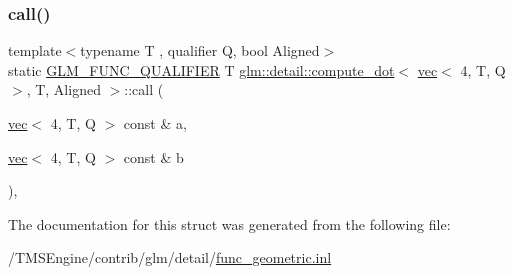 \subsubsection{\texorpdfstring{call()}{call()}}
{\footnotesize\ttfamily template$<$typename T , qualifier Q, bool Aligned$>$ \\
static \hyperlink{setup_8hpp_a33fdea6f91c5f834105f7415e2a64407}{G\+L\+M\+\_\+\+F\+U\+N\+C\+\_\+\+Q\+U\+A\+L\+I\+F\+I\+ER} T \hyperlink{structglm_1_1detail_1_1compute__dot}{glm\+::detail\+::compute\+\_\+dot}$<$ \hyperlink{structglm_1_1vec}{vec}$<$ 4, T, Q $>$, T, Aligned $>$\+::call (\begin{DoxyParamCaption}\item[{\hyperlink{structglm_1_1vec}{vec}$<$ 4, T, Q $>$ const \&}]{a,  }\item[{\hyperlink{structglm_1_1vec}{vec}$<$ 4, T, Q $>$ const \&}]{b }\end{DoxyParamCaption})\hspace{0.3cm}{\ttfamily [inline]}, {\ttfamily [static]}}



The documentation for this struct was generated from the following file\+:\begin{DoxyCompactItemize}
\item 
/\+T\+M\+S\+Engine/contrib/glm/detail/\hyperlink{func__geometric_8inl}{func\+\_\+geometric.\+inl}\end{DoxyCompactItemize}
